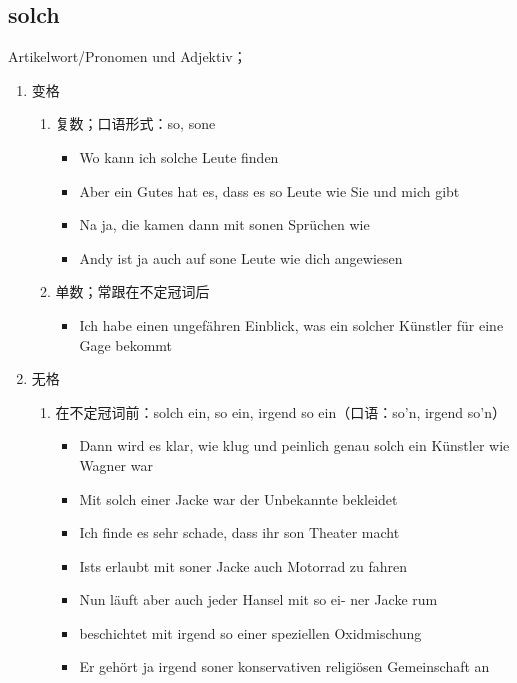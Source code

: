 \documentclass[UTF8]{report}
\begin{document}
\subsection{solch}
Artikelwort/Pronomen und Adjektiv；
\begin{enumerate}
    \item 变格
    \begin{enumerate}
        \item 复数；口语形式：so, sone
        \begin{itemize}
            \item Wo kann ich solche Leute finden
            \item Aber ein Gutes hat es, dass es so Leute wie Sie und mich gibt
            \item Na ja, die kamen dann mit sonen Sprüchen wie
            \item Andy ist ja auch auf sone Leute wie dich angewiesen
        \end{itemize}
        \item 单数；常跟在不定冠词后
        \begin{itemize}
            \item Ich habe einen ungefähren Einblick, was ein solcher Künstler für eine Gage bekommt
        \end{itemize}
    \end{enumerate}
    \item 无格
    \begin{enumerate}
        \item 在不定冠词前：solch ein, so ein, irgend so ein（口语：so'n, irgend so'n）
        \begin{itemize}
            \item Dann wird es klar, wie klug und peinlich genau solch ein Künstler wie Wagner war
            \item Mit solch einer Jacke war der Unbekannte bekleidet
            \item Ich finde es sehr schade, dass ihr son Theater macht
            \item Ists erlaubt mit soner Jacke auch Motorrad zu fahren
            \item Nun läuft aber auch jeder Hansel mit so ei- ner Jacke rum
            \item beschichtet mit irgend so einer speziellen Oxidmischung
            \item Er gehört ja irgend soner konservativen religiösen Gemeinschaft an
        \end{itemize}

\end{enumerate}
\end{enumerate}
\end{document}
